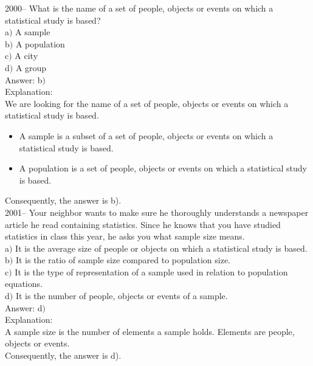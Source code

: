 \documentclass[letterpaper, 12pt]{article}
\begin{document}
2000-- What is the name of a set of people, objects or events on which a statistical study is based? \\

a$)$ A sample \\
b$)$ A population \\
c$)$ A city \\
d$)$ A group \\

Answer: b$)$ \\

Explanation:\\
We are looking for the name of a set of people, objects or events on which a statistical study is based. \\

\begin{itemize}
 \item A sample is a subset of a set of people, objects or events on which a statistical study is based. \\
\item A population is a set of people, objects or events on which a statistical study is based.\\
\end{itemize}
Consequently, the answer is b).\\

2001--  Your neighbor wants to make sure he thoroughly understands a newspaper article he read containing statistics. Since he knows that you have studied statistics in class this year, he asks you what sample size means.\\

a$)$  It is the average size of people or objects on which a statistical study is based.\\
b$)$  It is the ratio of sample size compared to population size.\\
c$)$  It is the type of representation of a sample used in relation to population equations.\\
d$)$  It is the number of people, objects or events of a sample. \\

Answer: d$)$ \\

Explanation:\\
A sample size is the number of elements a sample holds. Elements are people, objects or events. \\
Consequently, the answer is d). \\
\end{document}
